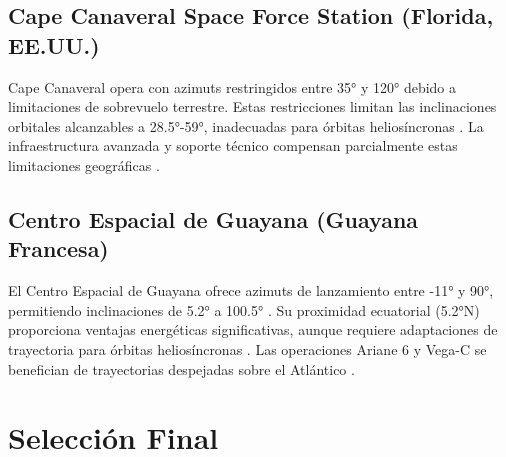 \subsection{Cape Canaveral Space Force Station (Florida, EE.UU.)}

Cape Canaveral opera con azimuts restringidos entre 35° y 120° debido a limitaciones de sobrevuelo terrestre. Estas restricciones limitan las inclinaciones orbitales alcanzables a 28.5°-59°, inadecuadas para órbitas heliosíncronas \cite{satobs2024}. La infraestructura avanzada y soporte técnico compensan parcialmente estas limitaciones geográficas \cite{stackexchange2022}.

\subsection{Centro Espacial de Guayana (Guayana Francesa)}

El Centro Espacial de Guayana ofrece azimuts de lanzamiento entre -11° y 90°, permitiendo inclinaciones de 5.2° a 100.5° \cite{satobs2024}. Su proximidad ecuatorial (5.2°N) proporciona ventajas energéticas significativas, aunque requiere adaptaciones de trayectoria para órbitas heliosíncronas \cite{wikipedia2024}. Las operaciones Ariane 6 y Vega-C se benefician de trayectorias despejadas sobre el Atlántico \cite{arianespace2024}.

\section{Selección Final}

